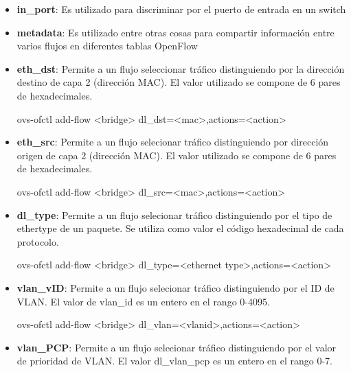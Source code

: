 \begin{itemize}

\item \textbf{in\_port}: Es utilizado para discriminar por el puerto de entrada en un switch

\item \textbf{metadata}: Es utilizado entre otras cosas para compartir informaci\'on entre varios flujos en diferentes tablas OpenFlow

\item \textbf{eth\_dst}: Permite a un flujo seleccionar tr\'afico distinguiendo por la direcci\'on destino de capa 2 (dirección MAC). El valor utilizado se compone de 6 pares de hexadecimales.

\begin{center}
ovs-ofctl add-flow <bridge> dl\_dst=<mac>,actions=<action>
\end{center}

\item \textbf{eth\_src}: Permite a un flujo selecionar tr\'afico distinguiendo por direcci\'on origen de capa 2 (direcci\'on MAC). El valor utilizado se compone de 6 pares de hexadecimales.

\begin{center}
ovs-ofctl add-flow <bridge> dl\_src=<mac>,actions=<action>
\end{center}

\item \textbf{dl\_type}: Permite a un flujo selecionar tr\'afico distinguiendo por el tipo de ethertype de un paquete. Se utiliza como valor el c\'odigo hexadecimal de cada protocolo.

\begin{center}
ovs-ofctl add-flow <bridge> dl\_type=<ethernet type>,actions=<action>
\end{center}

\item \textbf{vlan\_vID}: Permite a un flujo selecionar tr\'afico distinguiendo por el ID de VLAN. El valor de vlan\_id es un entero en el rango 0-4095.

\begin{center}
ovs-ofctl add-flow <bridge> dl\_vlan=<vlanid>,actions=<action>
\end{center}

\item \textbf{vlan\_PCP}: Permite a un flujo selecionar tr\'afico distinguiendo por el valor de prioridad de VLAN. El valor dl\_vlan\_pcp es un entero en el rango 0-7.


\end{itemize}
